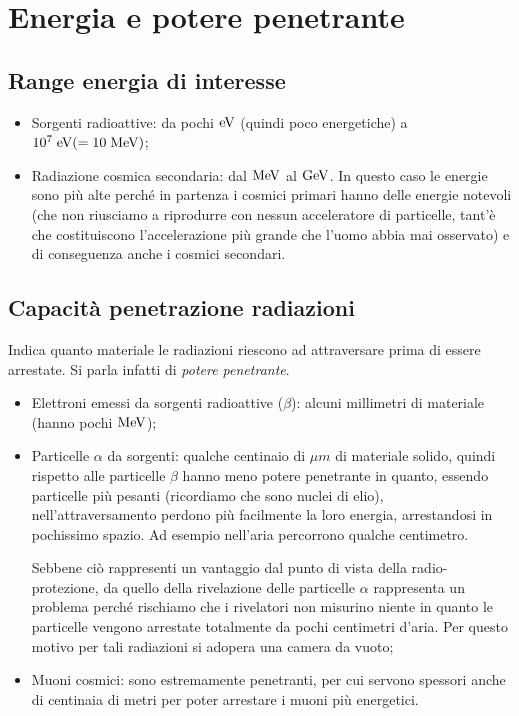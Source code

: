 \section{Energia e potere penetrante}

\subsection{Range energia di interesse}

\begin{itemize}[leftmargin=0.5cm]
    \item Sorgenti radioattive: da pochi $\rm eV$ (quindi poco energetiche) a $\rm 10^7 \; eV(=10 \; MeV)$;
    \item Radiazione cosmica secondaria: dal $\rm MeV$ al $\rm GeV$. In questo caso le energie sono più alte perché in partenza i cosmici primari hanno delle energie notevoli (che non riusciamo a riprodurre con nessun acceleratore di particelle, tant'è che costituiscono l'accelerazione più grande che l'uomo abbia mai osservato) e di conseguenza anche i cosmici secondari.
\end{itemize}

\subsection{Capacità penetrazione radiazioni}

Indica quanto materiale le radiazioni riescono ad attraversare prima di essere arrestate. Si parla infatti di \textit{potere penetrante}.

\begin{itemize}[leftmargin=0.5cm]
    \item Elettroni emessi da sorgenti radioattive ($\beta$): alcuni millimetri di materiale (hanno pochi $\rm MeV$);
    \item Particelle $\alpha$ da sorgenti: qualche centinaio di $\mu m$ di materiale solido, quindi rispetto alle particelle $\beta$ hanno meno potere penetrante in quanto, essendo particelle più pesanti (ricordiamo che sono nuclei di elio), nell'attraversamento perdono più facilmente la loro energia, arrestandosi in pochissimo spazio. Ad esempio nell'aria percorrono qualche centimetro.
    
    Sebbene ciò rappresenti un vantaggio dal punto di vista della radio-protezione, da quello della rivelazione delle particelle $\alpha$ rappresenta un problema perché rischiamo che i rivelatori non misurino niente in quanto le particelle vengono arrestate totalmente da pochi centimetri d'aria. Per questo motivo per tali radiazioni si adopera una camera da vuoto;
    \item Muoni cosmici: sono estremamente penetranti, per cui servono spessori anche di centinaia di metri per poter arrestare i muoni più energetici.
\end{itemize}

